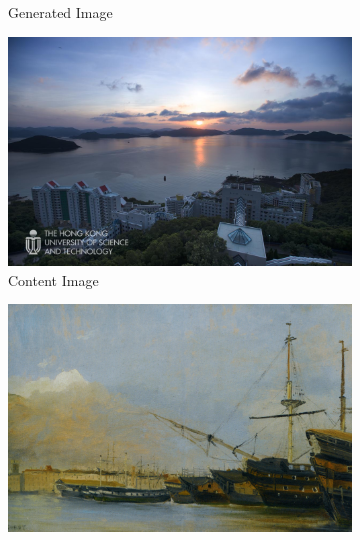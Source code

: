 \documentclass{article}
\begin{document}
\begin{figure}[h!]
\begin{minipage}{\textwidth}
\begin{subfigure}{0.25\textwidth}
            \caption{Generated Image}
        \end{subfigure}
    \end{minipage}
    
    \vspace{0.1cm} %
    
    \begin{minipage}{\textwidth}
        \centering
        \begin{subfigure}{0.25\textwidth}
            \includegraphics[width=\textwidth]{./data_set/HKUST/2.jpg}
            \caption{Content Image}
        \end{subfigure}
        \hfill %
        \begin{subfigure}{0.25\textwidth}
            \includegraphics[width=\textwidth]{./wikiart/Realism/camille-corot_toulon-battleships-dismantled.jpg}

\end{subfigure}
\end{minipage}
\end{figure}
\end{document}
